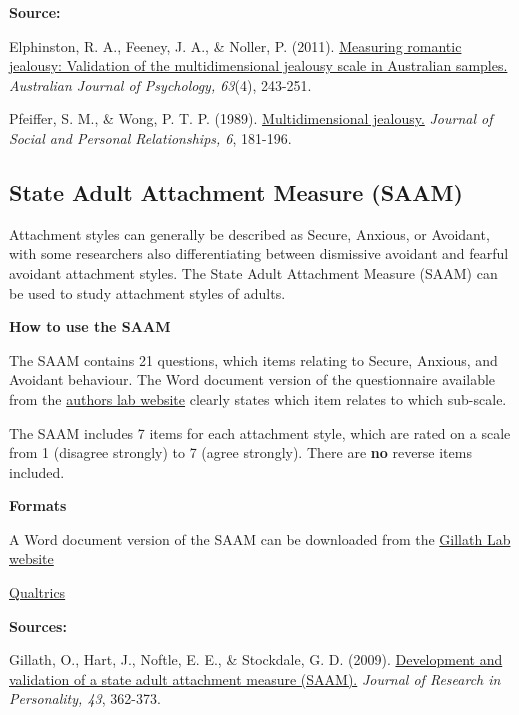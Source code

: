 \documentclass[
]{book}
\begin{document}
\textbf{Source:}

Elphinston, R. A., Feeney, J. A., \& Noller, P. (2011). \href{https://aps.onlinelibrary.wiley.com/doi/abs/10.1111/j.1742-9536.2011.00026.x}{Measuring romantic jealousy: Validation of the multidimensional jealousy scale in Australian samples.} \emph{Australian Journal of Psychology, 63}(4), 243-251.

Pfeiffer, S. M., \& Wong, P. T. P. (1989). \href{http://www.drpaulwong.com/wp-content/uploads/2018/03/Multidimensional-Jealousy-Scale-Pfeiffer-Wong-1989-Paper.pdf}{Multidimensional jealousy.} \emph{Journal of Social and Personal Relationships, 6}, 181-196.

\hypertarget{state-adult-attachment-measure-saam}{%
\subsection{State Adult Attachment Measure (SAAM)}\label{state-adult-attachment-measure-saam}}

Attachment styles can generally be described as Secure, Anxious, or Avoidant, with some researchers also differentiating between dismissive avoidant and fearful avoidant attachment styles. The State Adult Attachment Measure (SAAM) can be used to study attachment styles of adults.

\textbf{How to use the SAAM}

The SAAM contains 21 questions, which items relating to Secure, Anxious, and Avoidant behaviour. The Word document version of the questionnaire available from the \href{http://gillab.ku.edu/resources}{authors lab website} clearly states which item relates to which sub-scale.

The SAAM includes 7 items for each attachment style, which are rated on a scale from 1 (disagree strongly) to 7 (agree strongly). There are \textbf{no} reverse items included.

\textbf{Formats}

A Word document version of the SAAM can be downloaded from the \href{http://gillab.ku.edu/resources}{Gillath Lab website}

\href{questionnaires/State_Adult_Attachment_Measure_SAAM.qsf}{Qualtrics}

\textbf{Sources:}

Gillath, O., Hart, J., Noftle, E. E., \& Stockdale, G. D. (2009). \href{https://www.researchgate.net/profile/Omri_Gillath/publication/223185973_Development_and_validation_of_a_State_Adult_Attachment_Measure_SAAM/links/5a10d5c2458515cc5aa8073c/Development-and-validation-of-a-State-Adult-Attachment-Measure-SAAM.pdf}{Development and validation of a state adult attachment measure (SAAM).} \emph{Journal of Research in Personality, 43}, 362-373.
\end{document}
